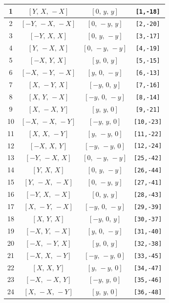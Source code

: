 \documentclass[fleqn,8pt]{jsarticle}
\begin{document}
\begin{longtable}{cccc}
1 & $\left[ Y,\, X,\, - X \right]$ & $\left[ 0,\, y,\, y \right]$ & {\tt [1,-18]} \\ \hline
2 & $\left[ - Y,\, - X,\, - X \right]$ & $\left[ 0,\, - y,\, y \right]$ & {\tt [2,-20]} \\ \hline
3 & $\left[ - Y,\, X,\, X \right]$ & $\left[ 0,\, y,\, - y \right]$ & {\tt [3,-17]} \\ \hline
4 & $\left[ Y,\, - X,\, X \right]$ & $\left[ 0,\, - y,\, - y \right]$ & {\tt [4,-19]} \\ \hline
5 & $\left[ - X,\, Y,\, X \right]$ & $\left[ y,\, 0,\, y \right]$ & {\tt [5,-15]} \\ \hline
6 & $\left[ - X,\, - Y,\, - X \right]$ & $\left[ y,\, 0,\, - y \right]$ & {\tt [6,-13]} \\ \hline
7 & $\left[ X,\, - Y,\, X \right]$ & $\left[ - y,\, 0,\, y \right]$ & {\tt [7,-16]} \\ \hline
8 & $\left[ X,\, Y,\, - X \right]$ & $\left[ - y,\, 0,\, - y \right]$ & {\tt [8,-14]} \\ \hline
9 & $\left[ X,\, - X,\, Y \right]$ & $\left[ y,\, y,\, 0 \right]$ & {\tt [9,-21]} \\ \hline
10 & $\left[ - X,\, - X,\, - Y \right]$ & $\left[ - y,\, y,\, 0 \right]$ & {\tt [10,-23]} \\ \hline
11 & $\left[ X,\, X,\, - Y \right]$ & $\left[ y,\, - y,\, 0 \right]$ & {\tt [11,-22]} \\ \hline
12 & $\left[ - X,\, X,\, Y \right]$ & $\left[ - y,\, - y,\, 0 \right]$ & {\tt [12,-24]} \\ \hline
13 & $\left[ - Y,\, - X,\, X \right]$ & $\left[ 0,\, - y,\, - y \right]$ & {\tt [25,-42]} \\ \hline
14 & $\left[ Y,\, X,\, X \right]$ & $\left[ 0,\, y,\, - y \right]$ & {\tt [26,-44]} \\ \hline
15 & $\left[ Y,\, - X,\, - X \right]$ & $\left[ 0,\, - y,\, y \right]$ & {\tt [27,-41]} \\ \hline
16 & $\left[ - Y,\, X,\, - X \right]$ & $\left[ 0,\, y,\, y \right]$ & {\tt [28,-43]} \\ \hline
17 & $\left[ X,\, - Y,\, - X \right]$ & $\left[ - y,\, 0,\, - y \right]$ & {\tt [29,-39]} \\ \hline
18 & $\left[ X,\, Y,\, X \right]$ & $\left[ - y,\, 0,\, y \right]$ & {\tt [30,-37]} \\ \hline
19 & $\left[ - X,\, Y,\, - X \right]$ & $\left[ y,\, 0,\, - y \right]$ & {\tt [31,-40]} \\ \hline
20 & $\left[ - X,\, - Y,\, X \right]$ & $\left[ y,\, 0,\, y \right]$ & {\tt [32,-38]} \\ \hline
21 & $\left[ - X,\, X,\, - Y \right]$ & $\left[ - y,\, - y,\, 0 \right]$ & {\tt [33,-45]} \\ \hline
22 & $\left[ X,\, X,\, Y \right]$ & $\left[ y,\, - y,\, 0 \right]$ & {\tt [34,-47]} \\ \hline
23 & $\left[ - X,\, - X,\, Y \right]$ & $\left[ - y,\, y,\, 0 \right]$ & {\tt [35,-46]} \\ \hline
24 & $\left[ X,\, - X,\, - Y \right]$ & $\left[ y,\, y,\, 0 \right]$ & {\tt [36,-48]} \\
\end{longtable}
\end{document}
